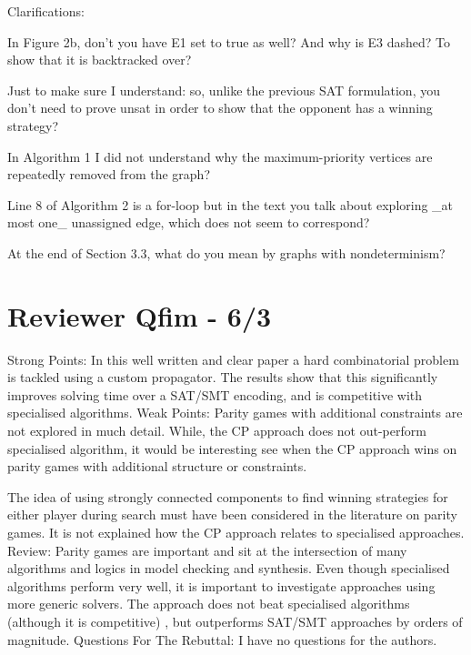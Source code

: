\documentclass{article}
\begin{document}
\begin{reviewer}
Clarifications:

In Figure 2b, don’t you have E1 set to true as well? And why is E3 dashed? To show that it is backtracked over?

Just to make sure I understand: so, unlike the previous SAT formulation, you don't need to prove unsat in order to show that the opponent has a winning strategy?

In Algorithm 1 I did not understand why the maximum-priority vertices are repeatedly removed from the graph?

Line 8 of Algorithm 2 is a for-loop but in the text you talk about exploring _at most one_ unassigned edge, which does not seem to correspond?

At the end of Section 3.3, what do you mean by graphs with nondeterminism?
\end{reviewer}



\section{Reviewer Qfim - 6/3} \label{ref:Qfim}

\begin{reviewer}
Strong Points: In this well written and clear paper a hard combinatorial problem  is tackled using a custom propagator. The results show that this significantly improves solving time over a SAT/SMT encoding, and is competitive with specialised algorithms.
Weak Points: Parity games with additional constraints are not explored in much detail. While, the CP approach does not out-perform specialised algorithm, it would be interesting see when the CP approach wins on parity games with additional structure or constraints. 

The idea of using strongly connected components to find winning strategies for either player during search must have been considered in the literature on parity games. It is not explained how the CP approach relates to specialised approaches.
Review: Parity games are important and sit at the intersection of many algorithms and logics in model checking and synthesis. Even though specialised algorithms perform very well, it is important to investigate approaches using more generic solvers. The approach does not beat specialised  algorithms (although it is competitive) , but outperforms SAT/SMT approaches by orders of magnitude.
Questions For The Rebuttal: I have no questions for the authors.
\end{reviewer}
\end{document}

